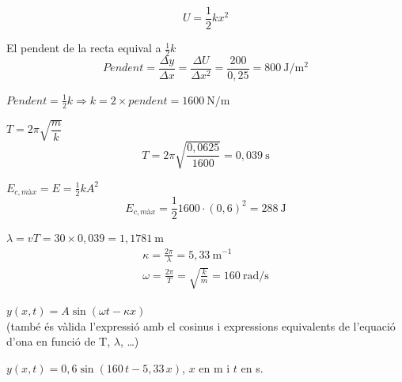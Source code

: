 \begin{solapartat}
\[ U = \frac{1}{2}kx^2 \]

 El pendent de la recta equival a $\frac{1}{2}k$
\[ \mathit{Pendent} = \frac{\Delta y}{\Delta x} = \frac{\Delta U}{\Delta x^2} = \frac{200}{0,25} = 800\ \mathrm{J/m^2} \]

 $\mathit{Pendent} = \frac{1}{2}k \Rightarrow k = 2\times \mathit{pendent} = 1600\ \mathrm{N/m}$

 $T = 2\pi\sqrt{\dfrac{m}{k}}$
\[ T = 2\pi\sqrt{\frac{0,0625}{1600}} = 0,039\ \mathrm{s} \]

 $E_{c,\textit{màx}} = E = \frac{1}{2}kA^2$
\[ E_{c,\textit{màx}} = \frac{1}{2}1600\cdot (0,6)^2 = 288\ \mathrm{J} \]
\end{solapartat}

\begin{solapartat}
 $\lambda = vT = 30\times 0,039 = 1,1781\ \mathrm{m}$
\begin{gather*}
\kappa = \frac{2\pi}{\lambda} = 5,33\ \mathrm{m^{-1}}\\
\omega = \frac{2\pi}{T} = \sqrt{\frac{k}{m}} = 160\ \mathrm{rad/s}
\end{gather*}

 $y(x, t) = A\sin(\omega t - \kappa x)$\\
(també és vàlida l'expressió amb el cosinus i expressions equivalents de l'equació d'ona en funció de T, $\lambda$, \ldots)

 $y(x, t) = 0,6\sin(160\,t - 5,33\,x)$, $x$ en m i $t$ en s.
\end{solapartat}
